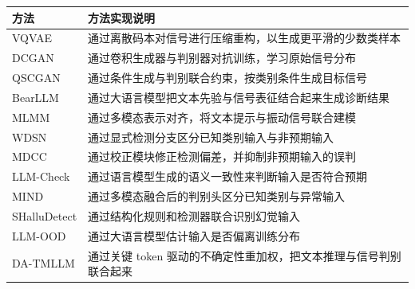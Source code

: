 \documentclass[printcopy,fontset=windows]{../Style/neuthesis}
\begin{document}
\begin{table}[p]
  \centering
  \label{tab:da_tmllm_methods}
  \begin{threeparttable}
    \scriptsize
    \begin{tabularx}{\textwidth}{>{\raggedright\arraybackslash}p{}Z}
      \toprule
      方法 & 方法实现说明 \\
      \midrule
      VQVAE &
      通过离散码本对信号进行压缩重构，以生成更平滑的少数类样本 \\
      DCGAN &
      通过卷积生成器与判别器对抗训练，学习原始信号分布 \\
      QSCGAN &
      通过条件生成与判别联合约束，按类别条件生成目标信号 \\
      BearLLM &
      通过大语言模型把文本先验与信号表征结合起来生成诊断结果 \\
      MLMM &
      通过多模态表示对齐，将文本提示与振动信号联合建模 \\
      WDSN &
      通过显式检测分支区分已知类别输入与非预期输入 \\
      MDCC &
      通过校正模块修正检测偏差，并抑制非预期输入的误判 \\
      LLM-Check &
      通过语言模型生成的语义一致性来判断输入是否符合预期 \\
      MIND &
      通过多模态融合后的判别头区分已知类别与异常输入 \\
      SHalluDetect &
      通过结构化规则和检测器联合识别幻觉输入 \\
      LLM-OOD &
      通过大语言模型估计输入是否偏离训练分布 \\
      DA-TMLLM &
      通过关键 token 驱动的不确定性重加权，把文本推理与信号判别联合起来 \\
      \bottomrule
    \end{tabularx}
  \end{threeparttable}
\end{table}
\end{document}
